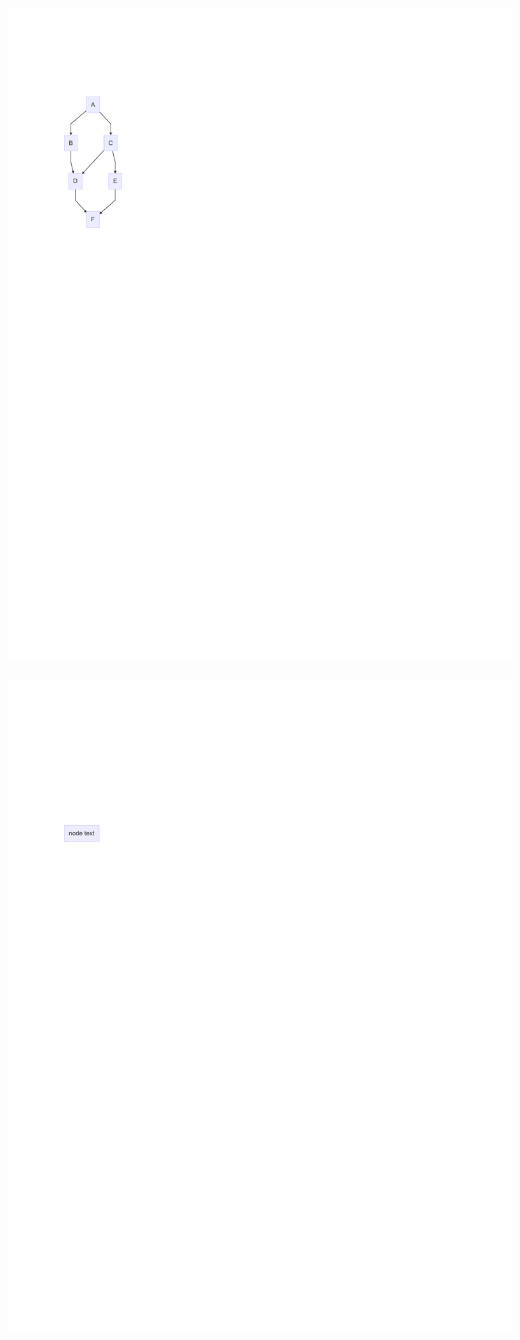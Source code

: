 \documentclass[
  letterpaper,
]{scrbook}
\begin{document}
\includegraphics{./summary_files/figure-pdf/unnamed-chunk-3-1.pdf}

\includegraphics{./summary_files/figure-pdf/unnamed-chunk-4-1.pdf}
\end{document}
